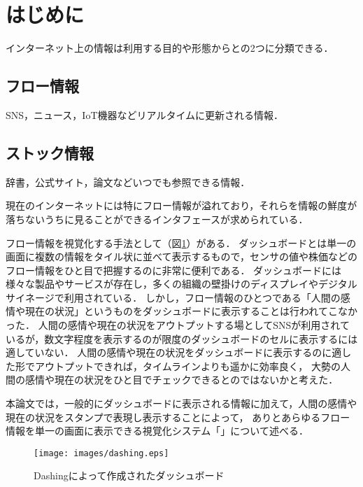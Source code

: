 \section{はじめに}

インターネット上の情報は利用する目的や形態からとの2つに分類できる．

\subsection*{フロー情報}

SNS，ニュース，IoT機器などリアルタイムに更新される情報．

\subsection*{ストック情報}

辞書，公式サイト，論文などいつでも参照できる情報．\vspace{0.2in}

現在のインターネットには特にフロー情報が溢れており，それらを情報の鮮度が落ちないうちに見ることができるインタフェースが求められている．

フロー情報を視覚化する手法として（図\ref{dashing}）がある．
ダッシュボードとは単一の画面に複数の情報をタイル状に並べて表示するもの\cite{few2005}で，センサの値や株価などのフロー情報をひと目で把握するのに非常に便利である．
ダッシュボードには様々な製品やサービスが存在し，多くの組織の壁掛けのディスプレイやデジタルサイネージで利用されている．
しかし，フロー情報のひとつである「人間の感情や現在の状況」というものをダッシュボードに表示することは行われてこなかった．
人間の感情や現在の状況をアウトプットする場としてSNSが利用されているが，数文字程度を表示するのが限度のダッシュボードのセルに表示するには適していない．
人間の感情や現在の状況をダッシュボードに表示するのに適した形でアウトプットできれば，タイムラインよりも遥かに効率良く，
大勢の人間の感情や現在の状況をひと目でチェックできるとのではないかと考えた．

本論文では，一般的にダッシュボードに表示される情報に加えて，人間の感情や現在の状況をスタンプで表現し表示することによって，
ありとあらゆるフロー情報を単一の画面に表示できる視覚化システム「」について述べる．

\begin{figure}[h]
\centering
\texttt{[image: images/dashing.eps]}
\caption{Dashingによって作成されたダッシュボード}
\label{dashing}
\end{figure}